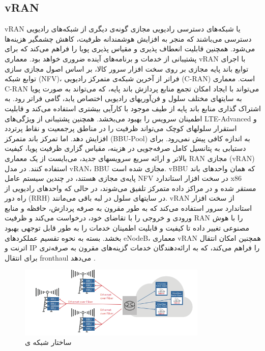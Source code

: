 \subsection{vRAN}
vRAN 
یا شبکه‌های دسترسی رادیویی مجازی
گونه‌ی دیگری از شبکه‌های رادیویی دسترسی می‌باشند که منجر به افزایش هوشمندانه ظرفیت، کاهش چشمگیر هزینه‌ها می‌شود. همچنین قابلیت انعطاف پذیری و مقیاس پذیری پویا را فراهم می‌کند که برای پشتیبانی از خدمات و برنامه‌های آینده ضروری خواهد بود.
معماری vRAN با اجرای توابع باند پایه مجازی بر روی سخت افزار سرور کالا، بر اساس اصول مجازی سازی توابع شبکه (NFV)، فراتر از آخرین شبکه‌ی  متمرکز رادیویی (C-RAN) است.
معماری C-RAN می‌تواند با ایجاد امکان تجمع منابع پردازش باند پایه، که می‌تواند به صورت پویا به سایتهای مختلف سلول و فن‌آوریهای رادیویی اختصاص یابد، گامی فراتر رود.
به اشتراک گذاری منابع باند پایه از طیف موجود با کارآیی بیشتری استفاده می‌کند و قابلیت اطمینان سرویس را بهبود می‌بخشد.
همچنین پشتیبانی از ویژگی‌های LTE-Advanced و استقرار سلولهای کوچک  می‌تواند ظرفیت را در مناطق پرجمعیت و نقاط پرتردد افزایش دهد.
اما تمرکز باند متمرکز (BBU-Pool) به اندازه کافی پیش نمی‌رود.
برای دستیابی به پتانسیل کامل صرفه‌جویی در هزینه، مقیاس گزاری ظرفیت پویا، کیفیت بالاتر و ارائه سریع سرویسهای جدید، می‌بایست از یک معماری RAN مجازی (vRAN) استفاده کنند. در مدل vRAN،
BBU 
مجازی شده است.
vBBU
که همان واحدهای باند پایه‌ی مجازی هستند، در چندین سیستم عامل NFV در سخت افزار استاندارد x86 مستقر شده و در مراکز داده متمرکز تلفیق می‌شوند، در حالی که واحدهای رادیویی از راه دور (RRH) در سایتهای سلول در لبه باقی می‌مانند.
vRAN 
از سخت افزار استاندارد سرور استفاده می‌کند که به طور مقرون به صرفه پردازش، حافظه و منابع ورودی و خروجی را با تقاضای خود، درخواست می‌کند و ظرفیت RAN را با هوش مصنوعی تغییر داده تا کیفیت و قابلیت اطمینان خدمات را به طور قابل توجهی بهبود بخشد.
بسته به نحوه تقسیم عملکردهای eNodeB، معماری vRAN همچنین امکان انتقال اترنت و IP را فراهم می‌کند، که به ارائه‌دهندگان خدمات گزینه‌های مقرون به صرفه‌تری برای انتقال fronthaul می‌دهد \cite{vran}.
\begin{figure}%
	\centering
	\includegraphics[width=0.8\textwidth]{./fig/vran}
	\caption{ساختار شبکه ی  \cite{vran}}
	\label{fig:vran}
\end{figure}

